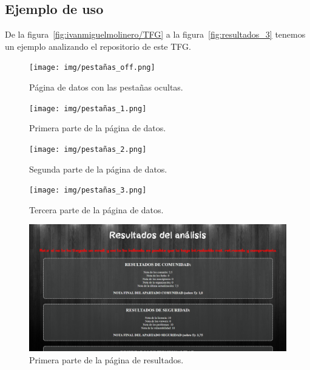 \documentclass[a4paper, 12pt]{book}
\begin{document}
\subsection{Ejemplo de uso}

De la figura~\ref{fig:ivanmiguelmolinero/TFG} a la figura~\ref{fig:resultados_3} tenemos un ejemplo analizando el repositorio de este TFG.

\begin{figure}
    
    \texttt{[image: img/pestañas\_off.png]}
    \caption{Página de datos con las pestañas ocultas.}\label{fig:pestañas_off}
\end{figure}

\begin{figure}
    
    \texttt{[image: img/pestañas\_1.png]}
    \caption{Primera parte de la página de datos.}\label{fig:pestañas_1}
\end{figure}

\begin{figure}
    
    \texttt{[image: img/pestañas\_2.png]}
    \caption{Segunda parte de la página de datos.}\label{fig:pestañas_2}
\end{figure}

\begin{figure}
    
    \texttt{[image: img/pestañas\_3.png]}
    \caption{Tercera parte de la página de datos.}\label{fig:pestañas_3}
\end{figure}

\begin{figure}
    
    \includegraphics[bb=0 0 800 600, width=12cm, keepaspectratio]{img/resultados_1.png}
    \caption{Primera parte de la página de resultados.}\label{fig:resultados_1}
\end{figure}
\end{document}
